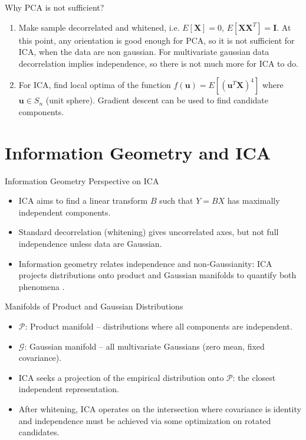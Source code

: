 \documentclass{beamer}
\begin{document}
\begin{frame}{Why PCA is not sufficient?}
\begin{enumerate}
  \item Make sample decorrelated and whitened, i.e. \( E[\mathbf{X}] = 0 \), \( E[\mathbf{X} \mathbf{X}^T] = \mathbf{I} \). At this point, any orientation is good enough for PCA, so it is not sufficient for ICA, when the data are non gaussian. For multivariate gaussian data decorrelation implies independence, so there is not much more for ICA to do.
  \item For ICA, find local optima of the function \( f(\mathbf{u}) = E[(\mathbf{u}^T \mathbf{X})^4] \) where \( \mathbf{u} \in S_n \) (unit sphere). Gradient descent can be used to find candidate components.
\end{enumerate}

\end{frame}


\section{Information Geometry and ICA}

\begin{frame}{Information Geometry Perspective on ICA}
  \begin{itemize}
    \item ICA aims to find a linear transform \(B\) such that \(Y = BX\) has maximally independent components.
    \item Standard decorrelation (whitening) gives uncorrelated axes, but not full independence unless data are Gaussian.
    \item Information geometry relates independence and non-Gaussianity: ICA projects distributions onto product and Gaussian manifolds to quantify both phenomena \cite{cardoso2022}.
  \end{itemize}
\end{frame}

\begin{frame}{Manifolds of Product and Gaussian Distributions}
  \begin{itemize}
    \item \(\mathcal{P}\): Product manifold -- distributions where all components are independent.
    \item \(\mathcal{G}\): Gaussian manifold -- all multivariate Gaussians (zero mean, fixed covariance).
    \item ICA seeks a projection of the empirical distribution onto \(\mathcal{P}\): the closest independent representation.
    \item After whitening, ICA operates on the intersection where covariance is identity and independence must be achieved via some optimization on rotated candidates.
  \end{itemize}
\end{frame}
\end{document}
